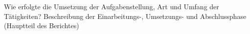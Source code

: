 \documentclass[crop=false]{standalone}
\begin{document}
Wie erfolgte die Umsetzung der Aufgabenstellung, Art und Umfang der Tätigkeiten? Beschreibung der Einarbeitungs-, Umsetzungs- und Abschlussphase
(Hauptteil des Berichtes)
\end{document}
